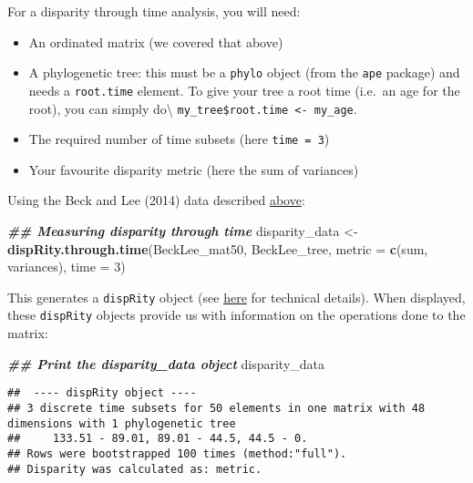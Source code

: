 \documentclass[
]{book}
\newenvironment{Shaded}{\begin{snugshade}}{\end{snugshade}}
\newcommand{\AttributeTok}[1]{\textcolor[rgb]{0.13,0.29,0.53}{#1}}
\newcommand{\DecValTok}[1]{\textcolor[rgb]{0.00,0.00,0.81}{#1}}
\newcommand{\DocumentationTok}[1]{\textcolor[rgb]{0.56,0.35,0.01}{\textbf{\textit{#1}}}}
\newcommand{\FunctionTok}[1]{\textcolor[rgb]{0.13,0.29,0.53}{\textbf{#1}}}
\newcommand{\NormalTok}[1]{#1}
\newcommand{\OtherTok}[1]{\textcolor[rgb]{0.56,0.35,0.01}{#1}}
\providecommand{\tightlist}{%
  \setlength{\itemsep}{0pt}\setlength{\parskip}{0pt}}
\begin{document}
For a disparity through time analysis, you will need:

\begin{itemize}
\tightlist
\item
  An ordinated matrix (we covered that above)
\item
  A phylogenetic tree: this must be a \texttt{phylo} object (from the \texttt{ape} package) and needs a \texttt{root.time} element. To give your tree a root time (i.e.~an age for the root), you can simply do\textbackslash{} \texttt{my\_tree\$root.time\ \textless{}-\ my\_age}.
\item
  The required number of time subsets (here \texttt{time\ =\ 3})
\item
  Your favourite disparity metric (here the sum of variances)
\end{itemize}

Using the Beck and Lee (2014) data described \protect\hyperlink{example-data}{above}:

\begin{Shaded}
\begin{Highlighting}[]
\DocumentationTok{\#\# Measuring disparity through time}
\NormalTok{disparity\_data }\OtherTok{\textless{}{-}} \FunctionTok{dispRity.through.time}\NormalTok{(BeckLee\_mat50, BeckLee\_tree,}
                                        \AttributeTok{metric =} \FunctionTok{c}\NormalTok{(sum, variances),}
                                        \AttributeTok{time =} \DecValTok{3}\NormalTok{)}
\end{Highlighting}
\end{Shaded}

This generates a \texttt{dispRity} object (see \protect\hyperlink{guts}{here} for technical details).
When displayed, these \texttt{dispRity} objects provide us with information on the operations done to the matrix:

\begin{Shaded}
\begin{Highlighting}[]
\DocumentationTok{\#\# Print the disparity\_data object}
\NormalTok{disparity\_data}
\end{Highlighting}
\end{Shaded}

\begin{verbatim}
##  ---- dispRity object ---- 
## 3 discrete time subsets for 50 elements in one matrix with 48 dimensions with 1 phylogenetic tree
##     133.51 - 89.01, 89.01 - 44.5, 44.5 - 0.
## Rows were bootstrapped 100 times (method:"full").
## Disparity was calculated as: metric.
\end{verbatim}
\end{document}
